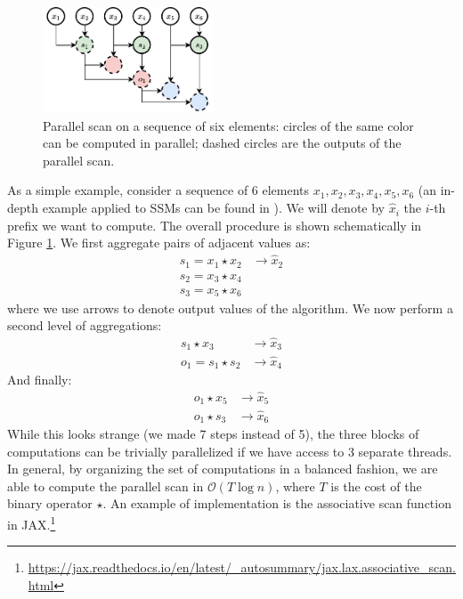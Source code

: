 \begin{figure}
    \centering
    \hspace{1em}\includegraphics[width=0.45\textwidth]{images/associative_scan}
    \caption{Parallel scan on a sequence of six elements: circles of the same color can be computed in parallel; dashed circles are the outputs of the parallel scan.}
    \label{fig:associative_scan}
\end{figure}

As a simple example, consider a sequence of 6 elements $x_1,x_2,x_3, x_4, x_5, x_6$ (an in-depth example applied to SSMs can be found in \cite{smith2022simplified}). We will denote by $\hat{x}_i$ the $i$-th prefix we want to compute. The overall procedure is shown schematically in Figure \ref{fig:associative_scan}. We first aggregate pairs of adjacent values as:
%
\begin{align*}
s_1 = x_1 \star x_2  & \rightarrow\hat{x}_2 \\s_2 = x_3 \star x_4 &\\ s_3 = x_5 \star x_6 &
\end{align*}
%
where we use arrows to denote output values of the algorithm. We now perform a second level of aggregations:
%
\begin{align*}
s_1 \star x_3 & \rightarrow \hat{x}_3 \\o_1 = s_1 \star s_2 & \rightarrow \hat{x}_4
\end{align*}
%
And finally:
%
\begin{align*} 
o_1 \star x_5 & \rightarrow \hat{x}_5 \\ o_1 \star s_3 & \rightarrow \hat{x}_6
\end{align*}
%
While this looks strange (we made 7 steps instead of 5), the three blocks of computations can be trivially parallelized if we have access to 3 separate threads. In general, by organizing the set of computations in a balanced fashion, we are able to compute the parallel scan in $\mathcal{O}(T \log n)$, where $T$ is the cost of the binary operator $\star$. An example of implementation is the associative scan function in JAX.\footnote{\url{https://jax.readthedocs.io/en/latest/_autosummary/jax.lax.associative_scan.html}}

